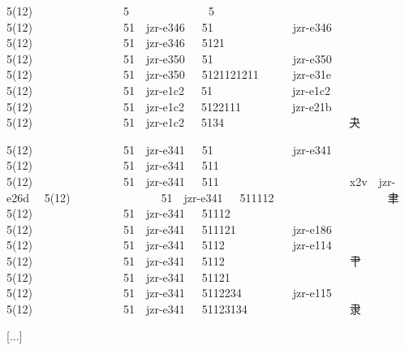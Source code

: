  
5(12)               { }5             { }5                         {} 
5(12)               { }51  jzr-e346  { }51              jzr-e346  {} 
5(12)               { }51  jzr-e346  { }5121                      {} 
5(12)               { }51  jzr-e350  { }51              jzr-e350  {} 
5(12)               { }51  jzr-e350  { }5121121211      jzr-e31e  {} 
5(12)               { }51  jzr-e1c2  { }51              jzr-e1c2  {} 
5(12)               { }51  jzr-e1c2  { }5122111         jzr-e21b  {} 
5(12)               { }51  jzr-e1c2  { }5134                      {\cjk{}夬} 
 
5(12)               { }51  jzr-e341  { }51              jzr-e341  {} 
5(12)               { }51  jzr-e341  { }511                       {} 
5(12)               { }51  jzr-e341  { }511                       {}x2v  jzr-e26d  {} 
5(12)               { }51  jzr-e341  { }511112                    {\cjk{}聿} 
5(12)               { }51  jzr-e341  { }51112                     {} 
5(12)               { }51  jzr-e341  { }511121          jzr-e186  {} 
5(12)               { }51  jzr-e341  { }5112            jzr-e114  {} 
5(12)               { }51  jzr-e341  { }5112                      {\cjk{}肀} 
5(12)               { }51  jzr-e341  { }51121                     {\cjk{}} 
5(12)               { }51  jzr-e341  { }5112234         jzr-e115  {} 
5(12)               { }51  jzr-e341  { }51123134                  {\cjk{}隶} 
 
[...] 
 

